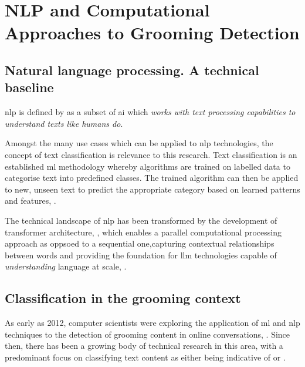 \documentclass[12pt,a4paper,oneside]{report}
\begin{document}
\chapter{NLP and Computational Approaches to Grooming Detection}  
\label{ch:nlp-and-computational-approaches-to-grooming-detection}
\section{Natural language processing. A technical baseline}
\label{sec:natural-language-processing-a-technical-baseline}
\gls{nlp} is defined by \citet{josegonzalez-gomez2024analyzing} as a subset of \gls{ai} which \textit{works with text processing capabilities to understand texts like humans do}.

Amongst the many use cases which can be applied to \gls{nlp} technologies, the concept of text classification is relevance to this research.  Text classification is an established \gls{ml} methodology whereby algorithms are trained on labelled data to categorise text into predefined classes.  The trained algorithm can then be applied to new, unseen text to predict the appropriate category based on learned patterns and features, \citep{belcic2024what,josegonzalez-gomez2024analyzing}.

The technical landscape of \gls{nlp} has been transformed by the development of transformer architecture, \citep{vaswani2017attention}, which 
enables a parallel computational processing approach as oppsoed to a sequential one,capturing contextual relationships between words and providing the foundation for \gls{llm} technologies capable of \textit{understanding} language at scale, \citep{khanna2024evolution, raiaan2024review}.

\section{Classification in the grooming context}
\label{sec:classification-in-the-grooming-context}
As early as 2012, computer scientists were exploring the application of \gls{ml} and \gls{nlp} techniques to the detection of grooming content in online conversations, \citep{inches2012overview}.  Since then, there has been a growing body of technical research in this area, with a predominant focus on classifying text content as either being indicative of  or .
\end{document}
